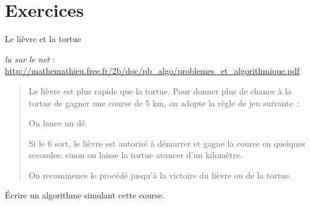 
\clearpage
\section{Exercices}

\begin{Exercice}{Le lièvre et la tortue}

	\emph{lu sur le net} :
	{\footnotesize \url{http://mathemathieu.free.fr/2b/doc/pb_algo/problemes_et_algorithmique.pdf}}
	
	\begin{quote}
	\og{}Le lièvre est plus rapide que la tortue.
	Pour donner plus de chance à la tortue de gagner une course de 5 km, 
	on adopte la règle de jeu suivante~:
	
	On lance un dé. 
	
	Si le 6 sort, le lièvre est autorisé à démarrer et gagne la course en quelques
	secondes; sinon on laisse la tortue avancer d’un kilomètre.
	
	On recommence le procédé jusqu'à la victoire du lièvre ou de la tortue.\fg{}
	\end{quote}
	
	Écrire un algorithme simulant cette course.
\end{Exercice}

